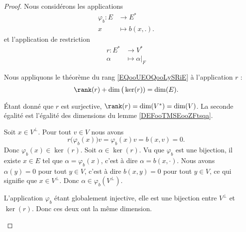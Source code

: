 \begin{proof}
	Nous considérons les applications
	\begin{equation}
		\begin{aligned}
			\varphi_b\colon E & \to E^*         \\
			x                 & \mapsto b(x,.).
		\end{aligned}
	\end{equation}
	et l'application de restriction
	\begin{equation}
		\begin{aligned}
			r\colon E^* & \to V^*           \\
			\alpha      & \mapsto \alpha|_F
		\end{aligned}
	\end{equation}

	\begin{subproof}
		Nous appliquons le théorème du rang \ref{EQooUEOQooLySRiE} à l'application \( r\) :
		\begin{equation}		\label{EQooSABBooUdWyZL}
			\rank(r)+\dim\big(\ker(r))=\dim(E).
		\end{equation}

		\spitem[\( \rank(r)=\dim(V)\)]

		Étant donné que \( r\) est surjective, \(\rank(r)=\dim(V^*)=\dim(V)\). La seconde égalité est l'égalité des dimensions du lemme \ref{DEFooTMSEooZFtsqa}.

		Soit \( x\in V^{\perp}\). Pour tout \( v\in V\) nous avons
		\begin{equation}
			r\big(\varphi_b(x))v=\varphi_b(x)v=b(x,v)=0.
		\end{equation}
		Donc \( \varphi_b(x)\in\ker(r)\).
		Soit \( \alpha\in \ker(r)\). Vu que \( \varphi_b\) est une bijection, il existe \( x\in E\) tel que \( \alpha=\varphi_b(x)\), c'est à dire \( \alpha=b(x,\cdot)\). Nous avons \( \alpha(y)=0\) pour tout \( y\in V\), c'est à dire \( b(x,y)=0\) pour tout \( y\in V\), ce qui signifie que \( x\in V^{\perp}\). Donc \( \alpha\in \varphi_b(V^{\perp})\).

		\spitem[\( \dim(V^{\perp})=\dim\big(\ker(r)\big)\)]
		L'application \( \varphi_b\) étant globalement injective, elle est une bijection entre \( V^{\perp}\) et \( \ker(r)\). Donc ces deux ont la même dimension.


\end{subproof}
\end{proof}
